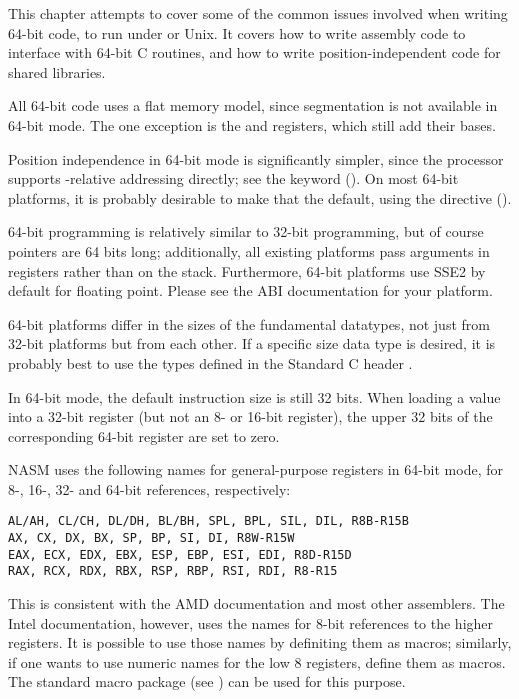%
%

This chapter attempts to cover some of the common issues involved when
writing 64-bit code, to run under  or Unix. It covers
how to write assembly code to interface with 64-bit C routines, and
how to write position-independent code for shared libraries.

All 64-bit code uses a flat memory model, since segmentation is not
available in 64-bit mode. The one exception is the  and
 registers, which still add their bases.

Position independence in 64-bit mode is significantly simpler, since
the processor supports -relative addressing directly; see the
 keyword (). On most 64-bit platforms,
it is probably desirable to make that the default, using the directive
 ().

64-bit programming is relatively similar to 32-bit programming, but
of course pointers are 64 bits long; additionally, all existing
platforms pass arguments in registers rather than on the stack.
Furthermore, 64-bit platforms use SSE2 by default for floating point.
Please see the ABI documentation for your platform.

64-bit platforms differ in the sizes of the fundamental datatypes, not
just from 32-bit platforms but from each other. If a specific size
data type is desired, it is probably best to use the types defined in
the Standard C header .

In 64-bit mode, the default instruction size is still 32 bits. When
loading a value into a 32-bit register (but not an 8- or 16-bit
register), the upper 32 bits of the corresponding 64-bit register are
set to zero.


NASM uses the following names for general-purpose registers in 64-bit
mode, for 8-, 16-, 32- and 64-bit references, respectively:

\begin{lstlisting}
AL/AH, CL/CH, DL/DH, BL/BH, SPL, BPL, SIL, DIL, R8B-R15B
AX, CX, DX, BX, SP, BP, SI, DI, R8W-R15W
EAX, ECX, EDX, EBX, ESP, EBP, ESI, EDI, R8D-R15D
RAX, RCX, RDX, RBX, RSP, RBP, RSI, RDI, R8-R15
\end{lstlisting}

This is consistent with the AMD documentation and most other
assemblers. The Intel documentation, however, uses the names
 for 8-bit references to the higher registers. It is
possible to use those names by definiting them as macros; similarly,
if one wants to use numeric names for the low 8 registers, define them
as macros. The standard macro package  (see
) can be used for this purpose.

